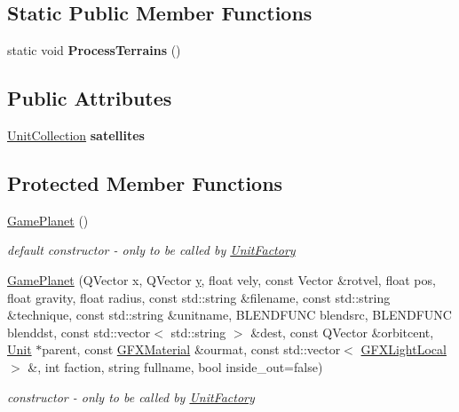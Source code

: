 \subsection*{Static Public Member Functions}
\begin{DoxyCompactItemize}
\item 
static void {\bfseries Process\+Terrains} ()\hypertarget{classGamePlanet_ac11fc5a8bd891764d32b366fe67ba007}{}\label{classGamePlanet_ac11fc5a8bd891764d32b366fe67ba007}

\end{DoxyCompactItemize}
\subsection*{Public Attributes}
\begin{DoxyCompactItemize}
\item 
\hyperlink{classUnitCollection}{Unit\+Collection} {\bfseries satellites}\hypertarget{classGamePlanet_a6d977b354c716307a9f8c2d131e7dab7}{}\label{classGamePlanet_a6d977b354c716307a9f8c2d131e7dab7}

\end{DoxyCompactItemize}
\subsection*{Protected Member Functions}
\begin{DoxyCompactItemize}
\item 
\hyperlink{classGamePlanet_a0482bae22611a255eaa2d622d7c3be74}{Game\+Planet} ()\hypertarget{classGamePlanet_a0482bae22611a255eaa2d622d7c3be74}{}\label{classGamePlanet_a0482bae22611a255eaa2d622d7c3be74}

\begin{DoxyCompactList}\small\item\em default constructor -\/ only to be called by \hyperlink{classUnitFactory}{Unit\+Factory} \end{DoxyCompactList}\item 
\hyperlink{classGamePlanet_a60e0eb2b3e04ecc0ee48df3672a6cd8b}{Game\+Planet} (Q\+Vector x, Q\+Vector \hyperlink{IceUtils_8h_aa7ffaed69623192258fb8679569ff9ba}{y}, float vely, const Vector \&rotvel, float pos, float gravity, float radius, const std\+::string \&filename, const std\+::string \&technique, const std\+::string \&unitname, B\+L\+E\+N\+D\+F\+U\+NC blendsrc, B\+L\+E\+N\+D\+F\+U\+NC blenddst, const std\+::vector$<$ std\+::string $>$ \&dest, const Q\+Vector \&orbitcent, \hyperlink{classUnit}{Unit} $\ast$parent, const \hyperlink{structGFXMaterial}{G\+F\+X\+Material} \&ourmat, const std\+::vector$<$ \hyperlink{structGFXLightLocal}{G\+F\+X\+Light\+Local} $>$ \&, int faction, string fullname, bool inside\+\_\+out=false)\hypertarget{classGamePlanet_a60e0eb2b3e04ecc0ee48df3672a6cd8b}{}\label{classGamePlanet_a60e0eb2b3e04ecc0ee48df3672a6cd8b}

\begin{DoxyCompactList}\small\item\em constructor -\/ only to be called by \hyperlink{classUnitFactory}{Unit\+Factory} \end{DoxyCompactList}\end{DoxyCompactItemize}
